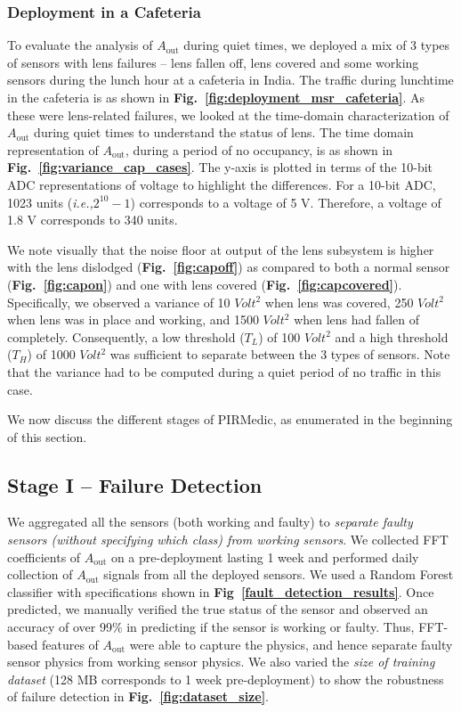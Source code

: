 \documentclass[manuscript]{acmart}
\newcommand{\ie}{{\it i.e.,}\xspace}
\newcommand{\aout}{$A_{\text{out}}$\xspace}
\newcommand{\sol}{{PIRMedic}\xspace}
\begin{document}
\subsubsection{Deployment in a Cafeteria}\label{subsubsec:cafeteria} To evaluate the analysis of \aout during quiet times, we deployed a mix of 3 types of sensors with lens failures -- lens fallen off, lens covered and some working sensors during the lunch hour at a cafeteria in India. The traffic during lunchtime in the cafeteria is as shown in {\bfseries Fig.~\ref{fig:deployment_msr_cafeteria}}. As these were lens-related failures, we looked at the time-domain characterization of \aout during quiet times to understand the status of lens. The time domain representation of \aout, during a period of no occupancy, is as shown in {\bfseries Fig.~\ref{fig:variance_cap_cases}}. The y-axis is plotted in terms of the 10-bit ADC representations of voltage to highlight the differences. For a 10-bit ADC, 1023 units (\ie $2^{10} - 1$) corresponds to a voltage of 5 V. Therefore, a voltage of 1.8 V corresponds to 340 units.

We note visually that the noise floor at output of the lens subsystem is higher with the lens dislodged ({\bfseries Fig.~\ref{fig:capoff}}) as compared to both a normal sensor ({\bfseries Fig.~\ref{fig:capon}}) and one with lens covered ({\bfseries Fig.~\ref{fig:capcovered}}). Specifically, we observed a variance of 10 $Volt^2$ when lens was covered, 250 $Volt^2$ when lens was in place and working, and 1500 $Volt^2$ when lens had fallen of completely. Consequently, a low threshold ($T_L$) of 100 $Volt^2$ and a high threshold ($T_H$) of 1000 $Volt^2$ was sufficient to separate between the 3 types of sensors. Note that the variance had to be computed during a quiet period of no traffic in this case. 

We now discuss the different stages of \sol, as enumerated in the beginning of this section. 

\subsection{Stage I -- Failure Detection}
\label{subsec:fail_detection}

We aggregated all the sensors (both working and faulty) to \textit{separate faulty sensors (without specifying which class) from working sensors}. 
We collected FFT coefficients of \aout on a pre-deployment lasting 1 week and performed daily collection of \aout signals from all the deployed sensors. 
We used a Random Forest classifier with specifications shown in {\bfseries Fig~\ref{fault_detection_results}}. 
Once predicted, we manually verified the true status of the sensor and observed an accuracy of over 99\% in predicting if the sensor is working or faulty. 
Thus, FFT-based features of \aout were able to capture the physics, and hence separate faulty sensor physics from working sensor physics.
We also varied the \textit{size of training dataset} (128 MB corresponds to 1 week pre-deployment) to show the robustness of failure detection in {\bfseries Fig.~\ref{fig:dataset_size}}.
\end{document}
